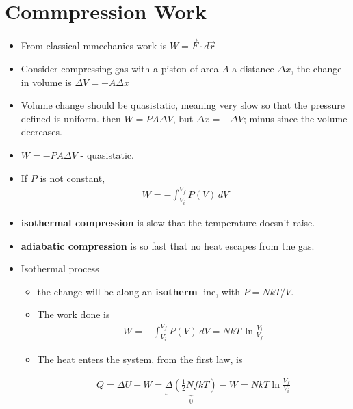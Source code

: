 \documentclass{book}
\begin{document}
 \section{Commpression Work}%
 \label{sec:Compression Work}

\begin{itemize}
 \item From classical mmechanics work is $W = \vec{F} \cdot d\vec{r}$
 \item  Consider compressing gas with a piston of area $A$ a distance $\Delta{x}$,
   the change in volume is $\Delta{V} = -A \Delta{x}$
 \item Volume change should be quasistatic, meaning very slow so that the pressure defined is uniform.
     then $W = P A \Delta{V}$, but $\Delta{x} = - \Delta{V}$; minus since the volume decreases.
 \item $W =- P A \Delta{V}$  -  quasistatic.
  \item If $P$ is not constant,
\begin{align}
\label{eq:gas work}
        W = - \int_{V_i}^{V_f} P(V) \, dV
\end{align}

  \item \textbf{isothermal compression} is slow that the temperature doesn't raise.
  \item \textbf{adiabatic compression} is so fast that no heat escapes from the gas.
  \item Isothermal process
        \begin{itemize}
          \item  the change will be along an \textbf{ isotherm } line,
                with $P = NkT / V$.
          \item The work done is
        \begin{align}
          W  = - \int_{V_i}^{V_f} P(V) \, dV = NkT \, \ln{ \frac{V_{i}}{V_{f}} }
        \end{align}
          \item The heat enters the system, from the first law, is

                \begin{align}
                  Q = \Delta{U} - W = \underbrace{ \Delta{( \frac{1}{2}NfkT )} }_{0} - W = NkT \ln{\frac{V_{f}}{V_{i}}}
                \end{align}
    \end{itemize}


\end{itemize}
\end{document}
